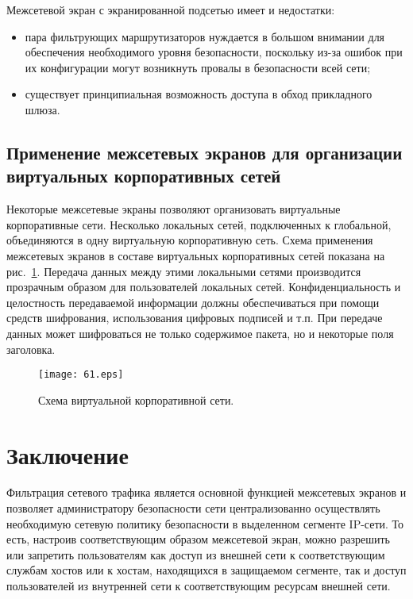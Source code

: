Межсетевой экран с экранированной подсетью имеет и недостатки:
\begin{itemize}
\item пара фильтрующих маршрутизаторов нуждается в большом
    внимании для обеспечения необходимого уровня безопасности,
    поскольку из-за ошибок при их конфигурации могут возникнуть
    провалы в безопасности всей сети;
\item существует принципиальная возможность доступа в обход
    прикладного шлюза.
\end{itemize}

\section{Применение межсетевых экранов для организации виртуальных
  корпоративных сетей}
Некоторые межсетевые экраны позволяют организовать виртуальные
корпоративные сети. Несколько локальных сетей, подключенных к
глобальной, объединяются в одну виртуальную корпоративную сеть. Схема
применения межсетевых экранов в составе виртуальных корпоративных
сетей показана на рис.~\ref{fig:gor:6}. Передача данных между этими локальными
сетями производится прозрачным образом для пользователей локальных
сетей. Конфиденциальность и целостность передаваемой информации должны
обеспечиваться при помощи средств шифрования, использования цифровых
подписей и т.п. При передаче данных может шифроваться не только
содержимое пакета, но и некоторые поля заголовка.

\begin{figure}[!htp]
\centerline{\texttt{[image: 61.eps]}}
\caption{Схема виртуальной корпоративной сети.}
\label{fig:gor:6}
\end{figure}


\chapter*{Заключение}

Фильтрация сетевого трафика является основной функцией межсетевых
экранов и позволяет администратору безопасности сети централизованно
осуществлять необходимую сетевую политику безопасности в выделенном
сегменте IP-сети. То есть, настроив соответствующим образом межсетевой
экран, можно разрешить или запретить пользователям как доступ из
внешней сети к соответствующим службам хостов или к хостам,
находящихся в защищаемом сегменте, так и доступ пользователей из
внутренней сети к соответствующим ресурсам внешней сети.

